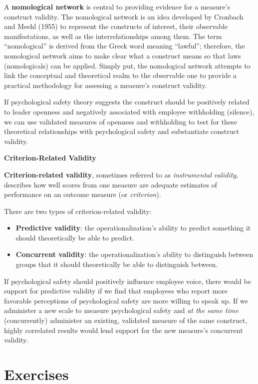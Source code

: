 \documentclass[]{book}
\providecommand{\tightlist}{%
  \setlength{\itemsep}{0pt}\setlength{\parskip}{0pt}}
\begin{document}
A \textbf{nomological network} is central to providing evidence for a measure's construct validity. The nomological network is an idea developed by Cronbach and Meehl (1955) to represent the constructs of interest, their observable manifestations, as well as the interrelationships among them. The term ``nomological'' is derived from the Greek word meaning ``lawful''; therefore, the nomological network aims to make clear what a construct means so that laws (nomologicals) can be applied. Simply put, the nomological network attempts to link the conceptual and theoretical realm to the observable one to provide a practical methodology for assessing a measure's construct validity.

If psychological safety theory suggests the construct should be positively related to leader openness and negatively associated with employee withholding (silence), we can use validated measures of openness and withholding to test for these theoretical relationships with psychological safety and substantiate construct validity.

\textbf{Criterion-Related Validity}

\textbf{Criterion-related validity}, sometimes referred to as \emph{instrumental validity}, describes how well scores from one measure are adequate estimates of performance on an outcome measure (or \emph{criterion}).

There are two types of criterion-related validity:

\begin{itemize}
\tightlist
\item
  \textbf{Predictive validity}: the operationalization's ability to predict something it should theoretically be able to predict.
\item
  \textbf{Concurrent validity}: the operationalization's ability to distinguish between groups that it should theoretically be able to distinguish between.
\end{itemize}

If psychological safety should positively influence employee voice, there would be support for predictive validity if we find that employees who report more favorable perceptions of psychological safety are more willing to speak up. If we administer a new scale to measure psychological safety and \emph{at the same time} (concurrently) administer an existing, validated measure of the same construct, highly correlated results would lend support for the new measure's concurrent validity.

\hypertarget{exercises-1}{%
\section{Exercises}\label{exercises-1}}
\end{document}
